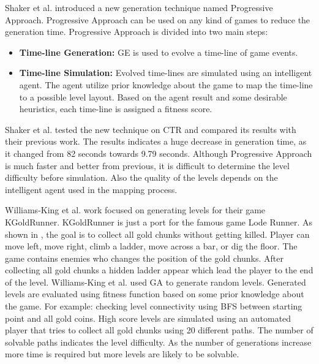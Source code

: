 Shaker et al.\cite{ctrProgressiveApproach} introduced a new generation technique named Progressive Approach. Progressive Approach can be used on any kind of games to reduce the generation time. Progressive Approach is divided into two main steps:
\begin{itemize} \itemsep0pt \parskip0pt 
	\item \textbf{Time-line Generation:} GE is used to evolve a time-line of game events.
	\item \textbf{Time-line Simulation:} Evolved time-lines are simulated using an intelligent agent. The agent utilize prior knowledge about the game to map the time-line to a possible level layout. Based on the agent result and some desirable heuristics, each time-line is assigned a fitness score.
\end{itemize}
Shaker et al. tested the new technique on CTR and compared its results with their previous work\cite{ctrSimulationApproach}. The results indicates a huge decrease in generation time, as it changed from 82 seconds towards 9.79 seconds. Although Progressive Approach is much faster and better from previous, it is difficult to determine the level difficulty before simulation. Also the quality of the levels depends on the intelligent agent used in the mapping process.\\\par


Williams-King et al.\cite{kgrAutomaticGeneration} work focused on generating levels for their game KGoldRunner. KGoldRunner is just a port for the famous game Lode Runner\cite{lodeRunner}. As shown in , the goal is to collect all gold chunks without getting killed. Player can move left, move right, climb a ladder, move across a bar, or dig the floor. The game contains enemies who changes the position of the gold chunks. After collecting all gold chunks a hidden ladder appear which lead the player to the end of the level. Williams-King et al. used GA to generate random levels. Generated levels are evaluated using fitness function based on some prior knowledge about the game. For example: checking level connectivity using BFS between starting point and all gold coins. High score levels are simulated using an automated player that tries to collect all gold chunks using 20 different paths. The number of solvable paths indicates the level difficulty. As the number of generations increase more time is required but more levels are likely to be solvable.

